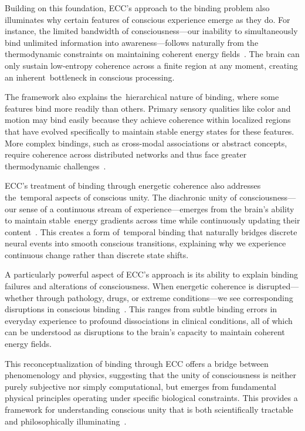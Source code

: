 Building on this foundation, ECC's approach to the binding problem also illuminates why certain features of conscious experience emerge as they do. For instance, the limited bandwidth of consciousness—our inability to simultaneously bind unlimited information into awareness—follows naturally from the thermodynamic constraints on maintaining coherent energy fields~\cite{laughlin2001}. The brain can only sustain low-entropy coherence across a finite region at any moment, creating an inherent~bottleneck in conscious processing.

The framework also explains the~hierarchical nature of binding, where some features bind more readily than others. Primary sensory qualities like color and motion may bind easily because they achieve coherence within localized regions that have evolved specifically to maintain stable energy states for these features. More complex bindings, such as cross-modal associations or abstract concepts, require coherence across distributed networks and thus face greater thermodynamic challenges~\cite{breakspear2005dynamics}.

ECC's treatment of binding through energetic coherence also addresses the~temporal aspects of conscious unity. The diachronic unity of consciousness—our sense of a continuous stream of experience—emerges from the brain's ability to maintain stable~energy gradients across time while continuously updating their content~\cite{bosl2025dynamical}. This creates a form of~temporal binding that naturally bridges discrete neural events into smooth conscious transitions, explaining why we experience continuous change rather than discrete state shifts.

A particularly powerful aspect of ECC's approach is its ability to explain binding failures and alterations of consciousness. When energetic coherence is disrupted—whether through pathology, drugs, or extreme conditions—we see corresponding disruptions in conscious binding~\cite{dehaene2011}. This ranges from subtle binding errors in everyday experience to profound dissociations in clinical conditions, all of which can be understood as disruptions to the brain's capacity to maintain coherent energy fields.

This reconceptualization of binding through ECC offers a bridge between phenomenology and physics, suggesting that the unity of consciousness is neither purely subjective nor simply computational, but emerges from fundamental physical principles operating under specific biological constraints. This provides a framework for understanding conscious unity that is both scientifically tractable and philosophically illuminating~\cite{da2024mathematical}.


